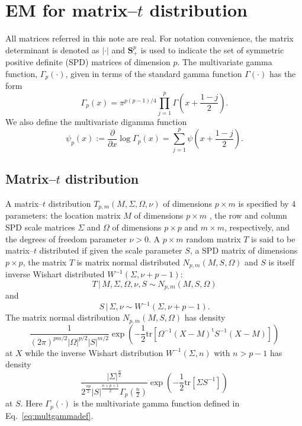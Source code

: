 \documentclass[english,listof=totoc]{scrartcl}
\begin{document}
\section{EM for matrix--$t$ distribution}\label{sec:derivation}

All matrices referred in this note are real. For notation convenience, the matrix determinant is denoted as $|\cdot|$ and $\mathbf{S}_+^p$ is used to indicate the set of symmetric positive definite (SPD) matrices of dimension $p$. The multivariate gamma
function, $\Gamma_{p}(\cdot)$, given in terms of the standard gamma function $\Gamma(\cdot)$ has the form
\begin{equation}
\Gamma_{p}(x)=\pi^{p(p-1)/4}\prod_{j=1}^{p}\Gamma\left(x+\frac{1-j}{2}\right).\label{eq:multgammadef}
\end{equation}
We also define the multivariate digamma function
%
\begin{equation}
\psi_{p}(x):=\frac{\partial}{\partial x}\log\Gamma_{p}(x)=\sum_{j=1}^{p}\psi\left(x+\frac{1-j}{2}\right).
\end{equation}

\subsection{Matrix--$t$ distribution}

A matrix--$t$ distribution $T_{p,m}(M,\Sigma,\Omega,\nu)$ of dimensions $p\times m$ is specified by 4 parameters: the location matrix $M$ of dimensions $p\times m$ , the row and column SPD scale matrices $\Sigma$ and $\Omega$ of dimensions $p\times p$ and $m\times m$, respectively, and the degrees of freedom parameter $\nu>0$. A $p \times m$ random matrix $T$ is said to be matrix--$t$ distributed if given the scale parameter $S$, a SPD matrix of dimensions $p\times p$, the matrix $T$ is matrix normal distributed $N_{p,m}(M,S,\Omega)$ and $S$ is itself inverse Wishart distributed $W^{-1}(\Sigma,\nu +p -1)$:
\begin{equation}
T\,|\,M,\Sigma,\Omega,\nu,S \sim N_{p,m}(M,S,\Omega)\label{eq:tdef1}
\end{equation}
and
\begin{equation}
S\,|\,\Sigma,\nu \sim W^{-1}(\Sigma,\nu+p-1).\label{eq:tdef2}
\end{equation}
The matrix normal distribution $N_{p,m}(M,S,\Omega)$ has density
\begin{equation}
\frac{1}{(2\pi)^{pm/2}|\Omega|^{p/2}|S|^{m/2}}\exp\left(-\frac{1}{2}\textrm{tr}\left[\Omega^{-1}(X-M)^{\textrm{t}}S^{-1}(X-M)\right]\right)\label{eq:ndistpdf}
\end{equation}
at $X$ while the inverse Wishart distribution $W^{-1}(\Sigma,n)$ with $n>p-1$ has density
\begin{equation}
\frac{|\Sigma|^{\frac{n}{2}}}{2^{\frac{n p}{2}}|S|^{\frac{n+p+1}{2}}\Gamma_{p}(\frac{n}{2})}\exp\left(-\frac{1}{2}\textrm{tr}\left[\Sigma S^{-1}\right]\right)\label{eq:wdistpdf}
\end{equation}
at $S$. Here $\Gamma_{p}(\cdot)$ is the
multivariate gamma function defined in Eq.~\eqref{eq:multgammadef}.
\end{document}
